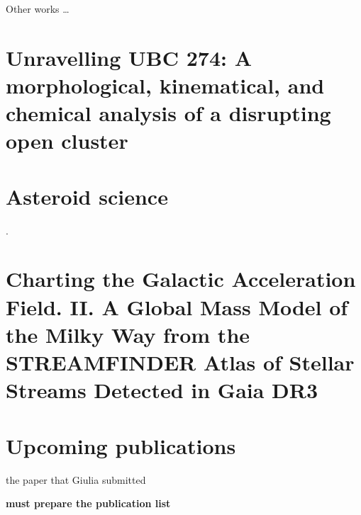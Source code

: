 Other works \dots 
\chapter{Unravelling UBC 274: A morphological, kinematical, and chemical analysis of a disrupting open cluster}
\citet{2022A&A...664A..31C}

\chapter{Asteroid science}
\citet{2023A&A...676A...5F}. \citet{2024A&A...682A..64B}

\chapter{Charting the Galactic Acceleration Field. II. A Global Mass Model of the Milky Way from the STREAMFINDER Atlas of Stellar Streams Detected in Gaia DR3}
\citet{2024ApJ...967...89I}

\chapter{Upcoming publications}
the paper that Giulia submitted 


\textbf{must prepare the publication list}